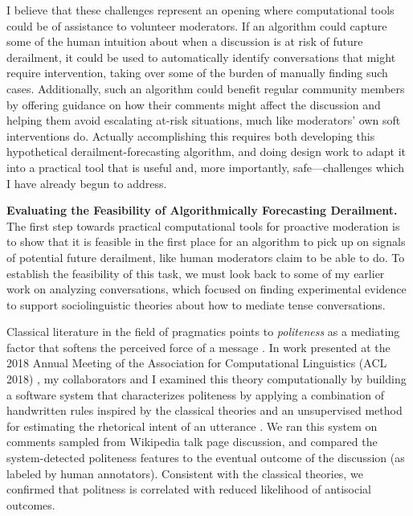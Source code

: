\documentclass[11pt,letterpaper]{article}
\renewcommand{\section}[1]{\vspace{0.25\baselineskip}\noindent\textbf{#1.}}
\begin{document}
I believe that these challenges represent an opening where computational tools could be of assistance to volunteer moderators.
If an algorithm could capture some of the human intuition about when a discussion is at risk of future derailment, it could be used to automatically identify conversations that might require intervention, taking over some of the burden of manually finding such cases.
Additionally, such an algorithm could benefit regular community members by offering guidance on how their comments might affect the discussion and helping them avoid escalating at-risk situations, much like moderators' own soft interventions do.
Actually accomplishing this requires both developing this hypothetical derailment-forecasting algorithm, and doing design work to adapt it into a practical tool that is useful and, more importantly, safe---challenges which I have already begun to address.

\section{Evaluating the Feasibility of Algorithmically Forecasting Derailment}
The first step towards practical computational tools for proactive moderation is to show that it is feasible in the first place for an algorithm to pick up on signals of potential future derailment, like human moderators claim to be able to do.
To establish the feasibility of this task, we must look back to some of my earlier work on analyzing conversations, which focused on finding experimental evidence to support sociolinguistic theories about how to mediate tense conversations.

Classical literature in the field of pragmatics points to \emph{politeness} as a mediating factor that softens the perceived force of a message \cite{brown_politeness:_1987,clark_polite_1980-1}.
In work presented at the 2018 Annual Meeting of the Association for Computational Linguistics (ACL 2018) \cite{zhang_conversations_2018}, my collaborators and I examined this theory computationally by building a software system that characterizes politeness by applying a combination of handwritten rules inspired by the classical theories \cite{danescu-niculescu-mizil_computational_2013} and an unsupervised method for estimating the rhetorical intent of an utterance \cite{zhang_asking_2017}.
We ran this system on comments sampled from Wikipedia talk page discussion, and compared the system-detected politeness features to the eventual outcome of the discussion (as labeled by human annotators).
Consistent with the classical theories, we confirmed that politness is correlated with reduced likelihood of antisocial outcomes.
\end{document}
